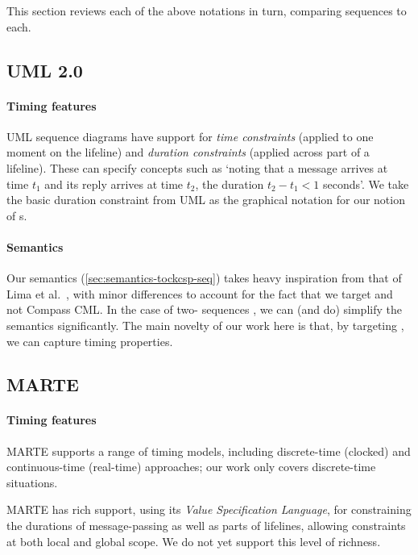 
This section reviews each of the above notations in turn, comparing
\langname{} sequences to each.

\subsection{UML 2.0}

\paragraph{Timing features}
UML sequence diagrams have support for \emph{time constraints} (applied to one
moment on the lifeline) and \emph{duration constraints} (applied across part
of a lifeline). 
These can specify concepts such as `noting that a message arrives at time
\(t_1\) and its reply arrives at time \(t_2\), the duration \(t_2 - t_1 < 1\) seconds'.
We take the basic duration constraint from UML as the graphical
notation for our notion of \mdeadlinestep s.

\paragraph{Semantics}
Our semantics (\cref{sec:semantics-tockcsp-seq}) takes heavy inspiration from
that of Lima et al.~\cite{lima-semantics}, with minor differences to account
for the fact that we target \tockcsp{} and not Compass CML.  In the case of
two-\mactor{} sequences , we can (and do)
simplify the semantics significantly.
The main novelty of our work here is that, by targeting \tockcsp, we can capture
timing properties.

\subsection{MARTE}

\paragraph{Timing features}
MARTE supports a range of timing models, including discrete-time (clocked) and
continuous-time (real-time) approaches; our work only covers discrete-time
situations.

MARTE has rich support, using its \emph{Value Specification Language}, for
constraining the durations of message-passing as well as parts of lifelines,
allowing constraints at both local
and global scope.  We do not yet support this level of richness.

